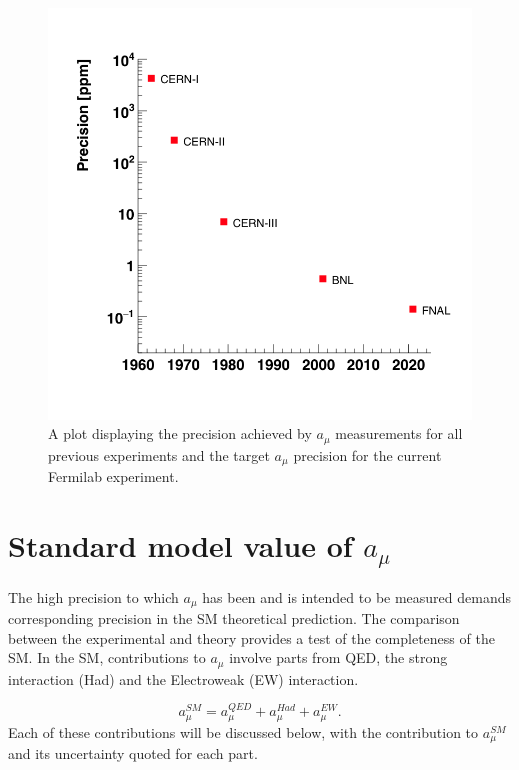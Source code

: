\begin{figure}[th]
\centering
\includegraphics[scale=0.5]{Figures/gm2_precision_vs_time.png}
\decoRule
\caption{A plot displaying the precision achieved by $a_{\mu}$ measurements for all previous experiments and the target $a_{\mu}$ precision for the current Fermilab experiment.}
\label{fig:gm2_precision_vs_time.png}
\end{figure}

\section{Standard model value of $a_{\mu}$}
\label{sec:sm_amu}

The high precision to which $a_{\mu}$ has been and is intended to be measured demands corresponding precision in the SM theoretical prediction. The comparison between the experimental and theory provides a test of the completeness of the SM. In the SM, contributions to $a_{\mu}$ involve parts from QED, the strong interaction (Had) and the Electroweak (EW) interaction.

\begin{equation}
a_{\mu}^{SM}=a_{\mu}^{QED} + a_{\mu}^{Had} + a_{\mu}^{EW}.
\end{equation}
Each of these contributions will be discussed below, with the contribution to $a_{\mu}^{SM}$ and its uncertainty quoted for each part. 


